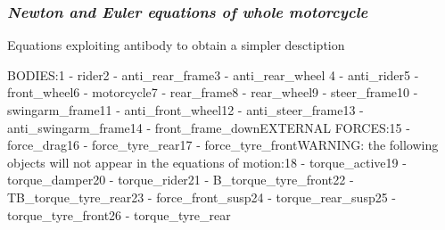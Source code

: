 \documentclass{article}
\begin{document}
\subsubsection{\textbf{\textit{Newton and Euler equations of whole motorcycle}}}
\begin{maplegroup}
\begin{Maple Normal}{
Equations exploiting antibody to obtain a simpler desctiption}\end{Maple Normal}

\end{maplegroup}
\begin{maplegroup}
\begin{mapleinput}
\end{mapleinput}
\mapleresult
BODIES:1 - rider2 - anti\_rear\_frame3 - anti\_rear\_wheel
4 - anti\_rider5 - front\_wheel6 - motorcycle7 - rear\_frame8 - rear\_wheel9 - steer\_frame10 - swingarm\_frame11 - anti\_front\_wheel12 - anti\_steer\_frame13 - anti\_swingarm\_frame14 - front\_frame\_downEXTERNAL FORCES:15 - force\_drag16 - force\_tyre\_rear17 - force\_tyre\_frontWARNING: the following objects will not appear in the equations of motion:18 - torque\_active19 - torque\_damper20 - torque\_rider21 - B\_torque\_tyre\_front22 - TB\_torque\_tyre\_rear23 - force\_front\_susp24 - torque\_rear\_susp25 - torque\_tyre\_front26 - torque\_tyre\_rear\mapleresult
\begin{maplelatex}
\end{maplelatex}
\end{maplegroup}
\begin{maplegroup}
\begin{mapleinput}
\end{mapleinput}
\end{maplegroup}
\begin{maplegroup}
\begin{mapleinput}
\end{mapleinput}
\mapleresult
\begin{maplelatex}
\end{maplelatex}
\end{maplegroup}
\end{document}
